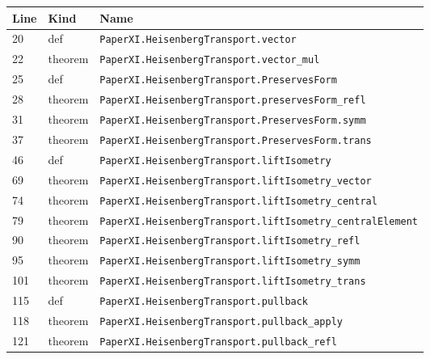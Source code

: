 \documentclass[10pt,oneside]{book}
\begin{document}
\begin{longtable}{@{}p{}p{}p{}@{}}\toprule Line&Kind&Name\\\midrule\endhead

20&def&\nolinkurl{PaperXI.HeisenbergTransport.vector}\\

22&theorem&\nolinkurl{PaperXI.HeisenbergTransport.vector_mul}\\

25&def&\nolinkurl{PaperXI.HeisenbergTransport.PreservesForm}\\

28&theorem&\nolinkurl{PaperXI.HeisenbergTransport.preservesForm_refl}\\

31&theorem&\nolinkurl{PaperXI.HeisenbergTransport.PreservesForm.symm}\\

37&theorem&\nolinkurl{PaperXI.HeisenbergTransport.PreservesForm.trans}\\

46&def&\nolinkurl{PaperXI.HeisenbergTransport.liftIsometry}\\

69&theorem&\nolinkurl{PaperXI.HeisenbergTransport.liftIsometry_vector}\\

74&theorem&\nolinkurl{PaperXI.HeisenbergTransport.liftIsometry_central}\\

79&theorem&\nolinkurl{PaperXI.HeisenbergTransport.liftIsometry_centralElement}\\

90&theorem&\nolinkurl{PaperXI.HeisenbergTransport.liftIsometry_refl}\\

95&theorem&\nolinkurl{PaperXI.HeisenbergTransport.liftIsometry_symm}\\

101&theorem&\nolinkurl{PaperXI.HeisenbergTransport.liftIsometry_trans}\\

115&def&\nolinkurl{PaperXI.HeisenbergTransport.pullback}\\

118&theorem&\nolinkurl{PaperXI.HeisenbergTransport.pullback_apply}\\

121&theorem&\nolinkurl{PaperXI.HeisenbergTransport.pullback_refl}\\


\end{longtable}
\end{document}
